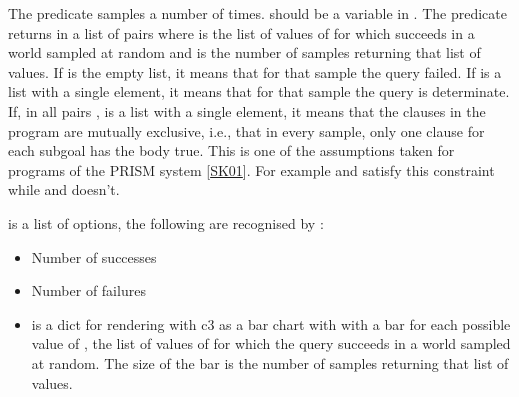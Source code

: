 \documentclass[letterpaper,10pt,english]{sphinxmanual}
\begin{document}
\sphinxAtStartPar
The predicate samples  a number of  times.  should be a variable in .
The predicate returns in  a list of pairs  where  is the list of values of  for which  succeeds in a world sampled at random and  is the number of samples returning that list of values. If  is the empty list, it means that for that sample the query failed.
If  is a list with a single element, it means that for that sample the query is determinate.
If, in all pairs ,  is a list with a single element, it means that the clauses in the program are mutually exclusive, i.e., that in every sample, only one clause for each subgoal has the body true.
This is one of the assumptions taken for programs of the PRISM system {[}\hyperlink{cite.index:id51}{SK01}{]}.
For example  and  satisfy this constraint while  and  doesn’t.

\sphinxAtStartPar
{} is a list of options, the following are recognised by :
\begin{itemize}
\item {} 
\sphinxAtStartPar
{} Number of successes

\item {} 
\sphinxAtStartPar
{} Number of failures

\item {} 
\sphinxAtStartPar
{}  is a dict for rendering with c3 as a bar chart with with a bar for each possible value of , the list of values of  for which the query succeeds in a world sampled at random. The size of the bar is the number of samples returning that list of values.

\end{itemize}
\end{document}
